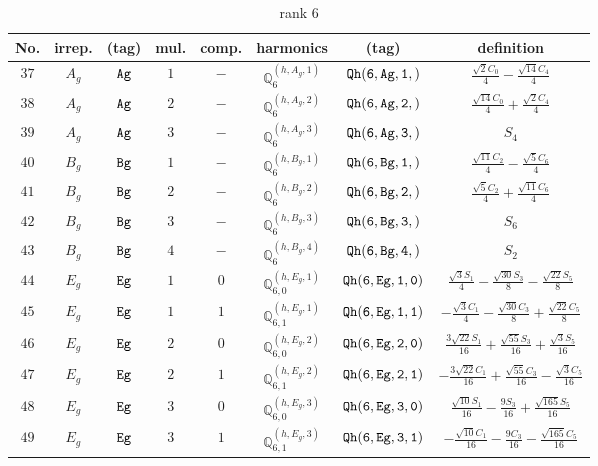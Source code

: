 \documentclass[fleqn,8pt]{jsarticle}
\begin{document}
\begin{table}[ht!]
\begin{center}
\caption{rank 6}
\renewcommand{\arraystretch}{1.3}
\begin{tabular}{cccccccc} \hline \hline
No. & irrep. & (tag) & mul. & comp. & harmonics & (tag) & definition \\ \hline
$ 37 $ & $ A_{g} $ & $ {\tt Ag} $ & $ 1 $ & $ - $ & $ \mathbb{Q}_{6}^{(h,A_{g},1)} $ & $ {\tt Qh(6,Ag,1,)} $ & $ \frac{\sqrt{2} C_{0}}{4} - \frac{\sqrt{14} C_{4}}{4} $ \\
$ 38 $ & $ A_{g} $ & $ {\tt Ag} $ & $ 2 $ & $ - $ & $ \mathbb{Q}_{6}^{(h,A_{g},2)} $ & $ {\tt Qh(6,Ag,2,)} $ & $ \frac{\sqrt{14} C_{0}}{4} + \frac{\sqrt{2} C_{4}}{4} $ \\
$ 39 $ & $ A_{g} $ & $ {\tt Ag} $ & $ 3 $ & $ - $ & $ \mathbb{Q}_{6}^{(h,A_{g},3)} $ & $ {\tt Qh(6,Ag,3,)} $ & $ S_{4} $ \\
$ 40 $ & $ B_{g} $ & $ {\tt Bg} $ & $ 1 $ & $ - $ & $ \mathbb{Q}_{6}^{(h,B_{g},1)} $ & $ {\tt Qh(6,Bg,1,)} $ & $ \frac{\sqrt{11} C_{2}}{4} - \frac{\sqrt{5} C_{6}}{4} $ \\
$ 41 $ & $ B_{g} $ & $ {\tt Bg} $ & $ 2 $ & $ - $ & $ \mathbb{Q}_{6}^{(h,B_{g},2)} $ & $ {\tt Qh(6,Bg,2,)} $ & $ \frac{\sqrt{5} C_{2}}{4} + \frac{\sqrt{11} C_{6}}{4} $ \\
$ 42 $ & $ B_{g} $ & $ {\tt Bg} $ & $ 3 $ & $ - $ & $ \mathbb{Q}_{6}^{(h,B_{g},3)} $ & $ {\tt Qh(6,Bg,3,)} $ & $ S_{6} $ \\
$ 43 $ & $ B_{g} $ & $ {\tt Bg} $ & $ 4 $ & $ - $ & $ \mathbb{Q}_{6}^{(h,B_{g},4)} $ & $ {\tt Qh(6,Bg,4,)} $ & $ S_{2} $ \\
$ 44 $ & $ E_{g} $ & $ {\tt Eg} $ & $ 1 $ & $ 0 $ & $ \mathbb{Q}_{6,0}^{(h,E_{g},1)} $ & $ {\tt Qh(6,Eg,1,0)} $ & $ \frac{\sqrt{3} S_{1}}{4} - \frac{\sqrt{30} S_{3}}{8} - \frac{\sqrt{22} S_{5}}{8} $ \\
$ 45 $ & $ E_{g} $ & $ {\tt Eg} $ & $ 1 $ & $ 1 $ & $ \mathbb{Q}_{6,1}^{(h,E_{g},1)} $ & $ {\tt Qh(6,Eg,1,1)} $ & $ - \frac{\sqrt{3} C_{1}}{4} - \frac{\sqrt{30} C_{3}}{8} + \frac{\sqrt{22} C_{5}}{8} $ \\
$ 46 $ & $ E_{g} $ & $ {\tt Eg} $ & $ 2 $ & $ 0 $ & $ \mathbb{Q}_{6,0}^{(h,E_{g},2)} $ & $ {\tt Qh(6,Eg,2,0)} $ & $ \frac{3 \sqrt{22} S_{1}}{16} + \frac{\sqrt{55} S_{3}}{16} + \frac{\sqrt{3} S_{5}}{16} $ \\
$ 47 $ & $ E_{g} $ & $ {\tt Eg} $ & $ 2 $ & $ 1 $ & $ \mathbb{Q}_{6,1}^{(h,E_{g},2)} $ & $ {\tt Qh(6,Eg,2,1)} $ & $ - \frac{3 \sqrt{22} C_{1}}{16} + \frac{\sqrt{55} C_{3}}{16} - \frac{\sqrt{3} C_{5}}{16} $ \\
$ 48 $ & $ E_{g} $ & $ {\tt Eg} $ & $ 3 $ & $ 0 $ & $ \mathbb{Q}_{6,0}^{(h,E_{g},3)} $ & $ {\tt Qh(6,Eg,3,0)} $ & $ \frac{\sqrt{10} S_{1}}{16} - \frac{9 S_{3}}{16} + \frac{\sqrt{165} S_{5}}{16} $ \\
$ 49 $ & $ E_{g} $ & $ {\tt Eg} $ & $ 3 $ & $ 1 $ & $ \mathbb{Q}_{6,1}^{(h,E_{g},3)} $ & $ {\tt Qh(6,Eg,3,1)} $ & $ - \frac{\sqrt{10} C_{1}}{16} - \frac{9 C_{3}}{16} - \frac{\sqrt{165} C_{5}}{16} $ \\
 \hline \hline
\end{tabular}
\end{center}
\end{table}
\end{document}
